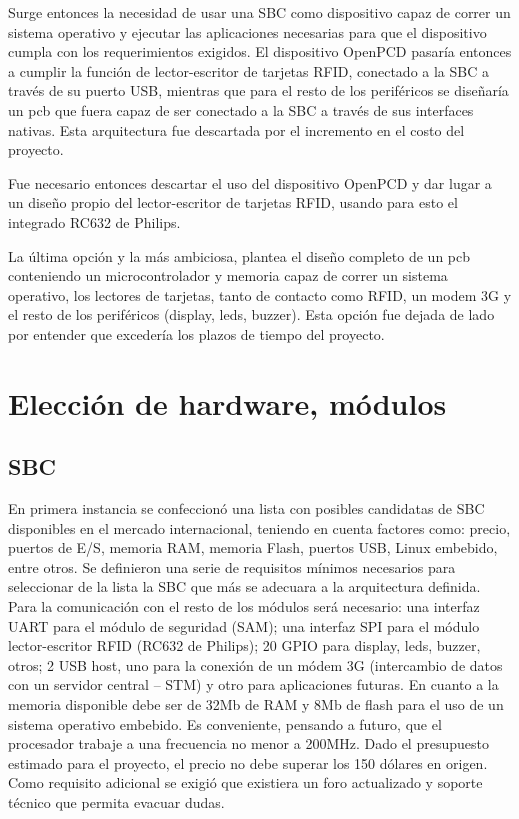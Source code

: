Surge entonces la necesidad de usar una SBC como dispositivo capaz de correr un sistema operativo y ejecutar las aplicaciones necesarias para que el dispositivo cumpla con los requerimientos exigidos. El dispositivo OpenPCD pasaría entonces a cumplir la función de lector-escritor de tarjetas RFID, conectado a la SBC a través de su puerto USB, mientras que para el resto de los periféricos se diseñaría un pcb que fuera capaz de ser conectado a la SBC a través de sus interfaces nativas. Esta arquitectura fue descartada por el incremento en el costo del proyecto.

Fue necesario entonces descartar el uso del dispositivo OpenPCD y dar lugar a un diseño propio del lector-escritor de tarjetas RFID, usando para esto el integrado RC632 de Philips.

La última opción y la más ambiciosa, plantea el diseño completo de un pcb conteniendo un microcontrolador y memoria capaz de correr un sistema operativo, los lectores de tarjetas, tanto de contacto como RFID, un modem 3G y el resto de los periféricos (display, leds, buzzer). Esta opción fue dejada de lado por entender que excedería los plazos de tiempo del proyecto.


\section{Elecci\'on de hardware, m\'odulos}

\subsection{SBC}
En primera instancia se confeccionó una lista con posibles candidatas de SBC disponibles
en el mercado internacional, teniendo en cuenta factores como: precio, puertos de E/S, memoria RAM, memoria Flash, puertos USB, Linux embebido, entre otros.
Se definieron una serie de requisitos mínimos necesarios para seleccionar de la lista la SBC que más se adecuara a la arquitectura definida.
Para la comunicación con el resto de los módulos será necesario: una interfaz UART para el módulo de seguridad (SAM); una interfaz SPI para el módulo lector-escritor RFID (RC632 de Philips); 20 GPIO para display, leds, buzzer, otros; 2 USB host, uno para la conexión de un módem 3G (intercambio de datos con un servidor central – STM) y otro para aplicaciones futuras. En cuanto a la memoria disponible debe ser de 32Mb de RAM y 8Mb de flash para el uso de un sistema operativo embebido. Es conveniente, pensando a futuro, que el procesador trabaje a una frecuencia no menor a 200MHz.
Dado el presupuesto estimado para el proyecto, el precio no debe superar los 150 dólares en origen.
Como requisito adicional se exigió que existiera un foro actualizado y soporte técnico que permita evacuar dudas.

